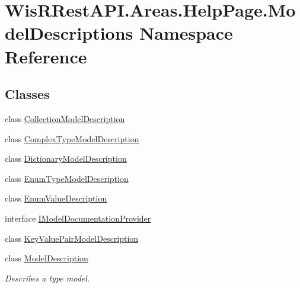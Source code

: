 \hypertarget{namespace_wis_r_rest_a_p_i_1_1_areas_1_1_help_page_1_1_model_descriptions}{}\section{Wis\+R\+Rest\+A\+P\+I.\+Areas.\+Help\+Page.\+Model\+Descriptions Namespace Reference}
\label{namespace_wis_r_rest_a_p_i_1_1_areas_1_1_help_page_1_1_model_descriptions}
\subsection*{Classes}
\begin{DoxyCompactItemize}
\item 
class \hyperlink{class_wis_r_rest_a_p_i_1_1_areas_1_1_help_page_1_1_model_descriptions_1_1_collection_model_description}{Collection\+Model\+Description}
\item 
class \hyperlink{class_wis_r_rest_a_p_i_1_1_areas_1_1_help_page_1_1_model_descriptions_1_1_complex_type_model_description}{Complex\+Type\+Model\+Description}
\item 
class \hyperlink{class_wis_r_rest_a_p_i_1_1_areas_1_1_help_page_1_1_model_descriptions_1_1_dictionary_model_description}{Dictionary\+Model\+Description}
\item 
class \hyperlink{class_wis_r_rest_a_p_i_1_1_areas_1_1_help_page_1_1_model_descriptions_1_1_enum_type_model_description}{Enum\+Type\+Model\+Description}
\item 
class \hyperlink{class_wis_r_rest_a_p_i_1_1_areas_1_1_help_page_1_1_model_descriptions_1_1_enum_value_description}{Enum\+Value\+Description}
\item 
interface \hyperlink{interface_wis_r_rest_a_p_i_1_1_areas_1_1_help_page_1_1_model_descriptions_1_1_i_model_documentation_provider}{I\+Model\+Documentation\+Provider}
\item 
class \hyperlink{class_wis_r_rest_a_p_i_1_1_areas_1_1_help_page_1_1_model_descriptions_1_1_key_value_pair_model_description}{Key\+Value\+Pair\+Model\+Description}
\item 
class \hyperlink{class_wis_r_rest_a_p_i_1_1_areas_1_1_help_page_1_1_model_descriptions_1_1_model_description}{Model\+Description}
\begin{DoxyCompactList}\small\item\em Describes a type model. \end{DoxyCompactList}\item 

\end{DoxyCompactItemize}
